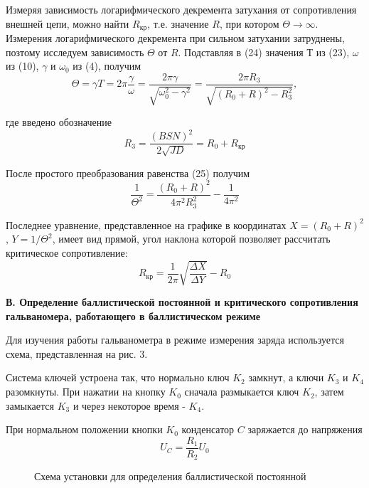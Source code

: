\documentclass[14pt]{article}
\begin{document}
Измеряя зависимость логарифмического декремента затухания от сопротивления внешней цепи, можно найти $R_{\text{кр}}$, т.е. значение $R$, при котором 
$\Theta \rightarrow \infty$. Измерения логарифмического декремента при сильном затухании затруднены, позтому исследуем зависимость $\Theta$ от $R$.
Подставляя в (24) значения Т из (23), $\omega$ из (10), $\gamma$ и $\omega_0$ из (4), получим
\begin{equation}
	\Theta = \gamma T = 2\pi\frac{\gamma}{\omega} = \frac{2\pi\gamma}{\sqrt{\omega_0^2 - \gamma^2}} = \frac{2\pi R_3}{\sqrt{(R_0 + R)^2 - R_3^2}},
\end{equation}

где введено обозначение
\begin{equation}
	R_3 = \frac{(BSN)^2}{2\sqrt{JD}} = R_0 + R_{\text{кр}}
\end{equation}

После простого преобразования равенства (25) получим
\begin{equation}
	\frac{1}{\Theta^2} = \frac{(R_0 + R)^2}{4\pi^2R_3^2} - \frac{1}{4\pi^2}
\end{equation}

Последнее уравнение, представленное на графике в координатах $X = (R_0 + R)^2$, $Y = 1/\Theta^2$, имеет вид прямой, угол наклона которой позволяет рассчитать критическое сопротивление:
\begin{equation}
	R_\text{кр} = \frac{1}{2\pi}\sqrt{\frac{\Delta X}{\Delta Y}} - R_0
\end{equation}

\vspace{1cm}
\textbf{В. Определение баллистической постоянной и критического сопротивления гальваномера, работающего в баллистическом режиме}

Для изучения работы гальванометра в режиме измерения заряда используется схема, представленная на рис. 3.

Система ключей устроена так, что нормально ключ $K_2$ замкнут, а ключи $K_3$ и $K_4$ разомкнуты. При нажатии на кнопку $K_0$ сначала размыкается ключ $K_2$, затем замыкается $K_3$ и через некоторое время - $K_4$.

При нормальном положении кнопки $K_0$ конденсатор $C$ заряжается до напряжения
$$
	U_C = \frac{R_1}{R_2}U_0
$$

\begin{figure}[h!]
	\caption{Схема установки для определения баллистической постоянной}
	\label{fig:image}
\end{figure}
\end{document}
